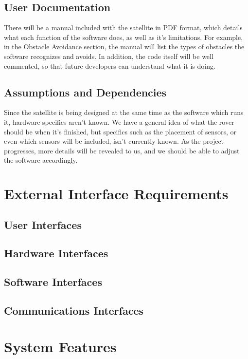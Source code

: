 \documentclass{scrreprt}
\begin{document}
\section{User Documentation}
There will be a manual included with the satellite in PDF format, which details what each function of the software does, as well as it's limitations. For example, in the Obstacle Avoidance section, the manual will list the types of obstacles the software recognizes and avoids. In addition, the code itself will be well commented, so that future developers can understand what it is doing.

\section{Assumptions and Dependencies}
Since the satellite is being designed at the same time as the software which runs it, hardware specifics aren't known. We have a general idea of what the rover should be when it's finished, but specifics such as the placement of sensors, or even which sensors will be included, isn't currently known. As the project progresses, more details will be revealed to us, and we should be able to adjust the software accordingly.



\chapter{External Interface Requirements}

\section{User Interfaces}


\section{Hardware Interfaces}


\section{Software Interfaces}


\section{Communications Interfaces}



\chapter{System Features}
\end{document}
